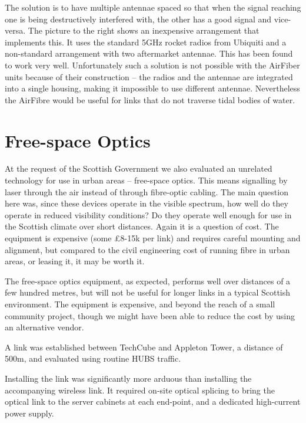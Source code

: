 \documentclass{amsart}
\begin{document}
The solution is to have multiple antennae spaced so that when
the signal reaching one is being destructively interfered with, the
other has a good signal and vice-versa. The picture to the right shows
an inexpensive arrangement that implements this. It uses the standard
5GHz rocket radios from Ubiquiti and a non-standard arrangement with
two aftermarket antennae. This has been found to work very
well. Unfortunately such a solution is not possible with the AirFiber
units because of their construction -- the radios and the antennae are
integrated into a single housing, making it impossible to use
different antennae. Nevertheless the AirFibre would be useful for
links that do not traverse tidal bodies of water.

\clearpage
\section{Free-space Optics}
\label{sec:fso}



At the request of the Scottish Government we also evaluated an
unrelated technology for use in urban areas – free-space optics. This
means signalling by laser through the air instead of through
fibre-optic cabling. The main question here was, since these devices
operate in the visible spectrum, how well do they operate in reduced
visibility conditions? Do they operate well enough for use in the Scottish
climate over short distances. Again it is a question of cost. The
equipment is expensive (some \pounds 8-15k per link) and requires careful
mounting and alignment, but compared to the civil engineering cost of
running fibre in urban areas, or leasing it, it may be worth it.

The free-space optics equipment, as expected, performs well over
distances of a few hundred metres, but will not be useful for longer
links in a typical Scottish environment. The equipment is expensive,
and beyond the reach of a small community project, though we might
have been able to reduce the cost by using an alternative vendor.

A link was established between TechCube and Appleton Tower, a distance
of 500m, and evaluated using routine HUBS traffic.

Installing the link was significantly more arduous than installing the
accompanying wireless link. It required on-site optical splicing to
bring the optical link to the server cabinets at each end-point, and a
dedicated high-current power supply.
\end{document}
